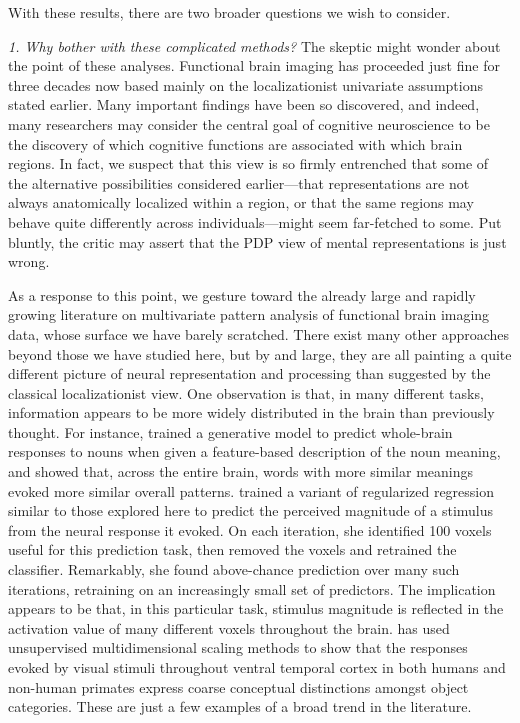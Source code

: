 With these results, there are two broader questions we wish to consider.

{\em 1. Why bother with these complicated methods?} The skeptic might wonder about the point of these analyses. Functional brain imaging has proceeded just fine for three decades now based mainly on the localizationist univariate assumptions stated earlier. Many important findings have been so discovered, and indeed, many researchers may consider the central goal of cognitive neuroscience to be the discovery of which cognitive functions are associated with which brain regions. In fact, we suspect that this view is so firmly entrenched that some of the alternative possibilities considered earlier---that representations are not always anatomically localized within a region, or that the same regions may behave quite differently across individuals---might seem far-fetched to some. Put bluntly, the critic may assert that the PDP view of mental representations is just wrong. 

As a response to this point, we gesture toward the already large and rapidly growing literature on multivariate pattern analysis of functional brain imaging data, whose surface we have barely scratched. There exist many other approaches beyond those we have studied here, but by and large, they are all painting a quite different picture of neural representation and processing than suggested by the classical localizationist view. One observation is that, in many different tasks, information appears to be more widely distributed in the brain than previously thought. For instance, \cite{mitchell_predicting_2008} trained a generative model to predict whole-brain responses to nouns when given a feature-based description of the noun meaning, and showed that, across the entire brain, words with more similar meanings evoked more similar overall patterns. \cite{rish_sparse_2012} trained a variant of regularized regression similar to those explored here to predict the perceived magnitude of a stimulus from the neural response it evoked. On each iteration, she identified 100 voxels useful for this prediction task, then removed the voxels and retrained the classifier. Remarkably, she found above-chance prediction over many such iterations, retraining on an increasingly small set of predictors. The implication appears to be that, in this particular task, stimulus magnitude is reflected in the activation value of many different voxels throughout the brain. \cite{kriegeskorte_representational_2008} has used unsupervised multidimensional scaling methods to show that the responses evoked by visual stimuli throughout ventral temporal cortex in both humans and non-human primates express coarse conceptual distinctions amongst object categories. These are just a few examples of a broad trend in the literature.

